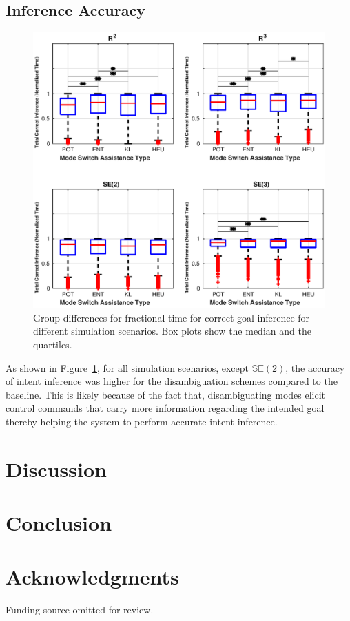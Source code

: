 \documentclass[conference]{IEEEtran}
\begin{document}
\subsection{Inference Accuracy}
\begin{figure}[t!]
	\centering
	\includegraphics[width= 1.\hsize, height=0.35\vsize]{./figures/correct_inference.eps}
	\vspace{-0.75cm}
	\caption{Group differences for fractional time for correct goal inference for different simulation scenarios. Box plots show the median and the quartiles.} 
	\label{fig:correct_inference}
\end{figure}
As shown in Figure~\ref{fig:correct_inference}, for all simulation scenarios, except $\mathbb{SE}(2)$, the accuracy of intent inference was higher for the disambiguation schemes compared to the baseline. This is likely because of the fact that, disambiguating modes elicit control commands that carry more information regarding the intended goal thereby helping the system to perform accurate intent inference. 
\section{Discussion}\label{sec:discussions}
\section{Conclusion}\label{sec:conclusions}


\section*{Acknowledgments}
Funding source omitted for review. 
\balance


\end{document}
